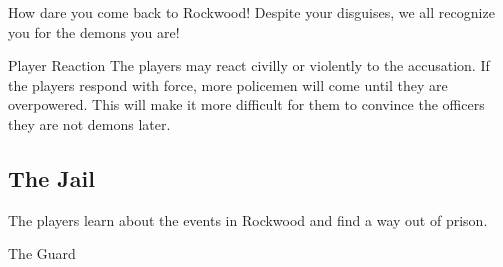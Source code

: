 \documentclass[10pt,twoside,twocolumn]{article}
\begin{document}
\begin{quotebox}
How dare you come back to Rockwood!  Despite your disguises, we all recognize you for the demons you are!
\end{quotebox}

\begin{commentbox}{Player Reaction}
The players may react civilly or violently to the accusation.  If the players respond with force, more policemen will come until they are overpowered.  This will make it more difficult for them to convince the officers they are not demons later.
\end{commentbox}

\subsection{The Jail}
The players learn about the events in Rockwood and find a way out of prison.

\begin{paperbox}{The Guard}
\end{paperbox}

\end{document}
